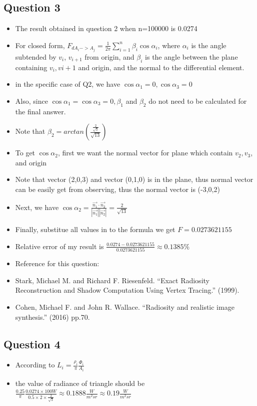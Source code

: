 \documentclass{article}
\begin{document}
\subsection*{Question 3}
\begin{itemize}
    \item The result obtained in question 2 when n=100000 is 0.0274
    \item For closed form, $F_{dA_i->A_j}=\frac{1}{2\pi} \sum_{i=1}^n \beta_i \cos \alpha_i$, 
    where $\alpha_i$ is the angle subtended by $v_i$, $v_{i+1}$ from origin, and $\beta_i$ is 
    the angle between the plane containing $v_i , v{i+1}$  and origin, and the normal to the differential
    element.
    \item in the specific case of Q2, we have $\cos \alpha_1 = 0, \cos \alpha_3 = 0$
    \item Also, since $\cos \alpha_1 = \cos \alpha_3 = 0, \beta_1$ and $\beta_2$ do not need to be calculated
        for the final answer.
    \item Note that $\beta_2 = arctan(\frac{\frac{2}{\sqrt{3}}}{\sqrt{13}})$
    \item To get $\cos \alpha_2$, first we want the normal vector for plane which contain $v_2, v_3$, and origin
    \item Note that vector (2,0,3) and vector (0,1,0) is in the plane, thus normal vector can be easily get from
        observing, thus the normal vector is (-3,0,2)
    \item Next, we have $\cos \alpha_2 = \frac{\vec{n_1} \cdot \vec{n_2}}{|\vec{n_1}||\vec{n_2}|} = \frac{2}{\sqrt{13}}$
    \item Finally, substitue all values in to the formula we get $F=0.0273621155$
    \item Relative error of my result is $\frac{0.0274-0.0273621155}{0.0273621155} \approx 0.1385\%$
    \item Reference for this question: 
    \item Stark, Michael M. and Richard F. Riesenfeld. “Exact Radiosity Reconstruction and Shadow Computation Using Vertex Tracing.” (1999).
    \item Cohen, Michael F. and John R. Wallace. “Radiosity and realistic image synthesis.” (2016) pp.70.
  

\end{itemize}

\newpage
\subsection*{Question 4}
\begin{itemize}
    \item According to $L_i=\frac{\rho_i}{\pi} \frac{\Phi_i}{A_i}$
    \item the value of radiance of triangle should be $\frac{0.25}{\pi} \frac{0.0274\times 100W}{0.5\times 2\times \frac{2}{\sqrt{3}}}\approx 0.1888 \frac{W}{m^2sr}\approx 0.19 \frac{W}{m^2sr}$
\end{itemize}
\end{document}
